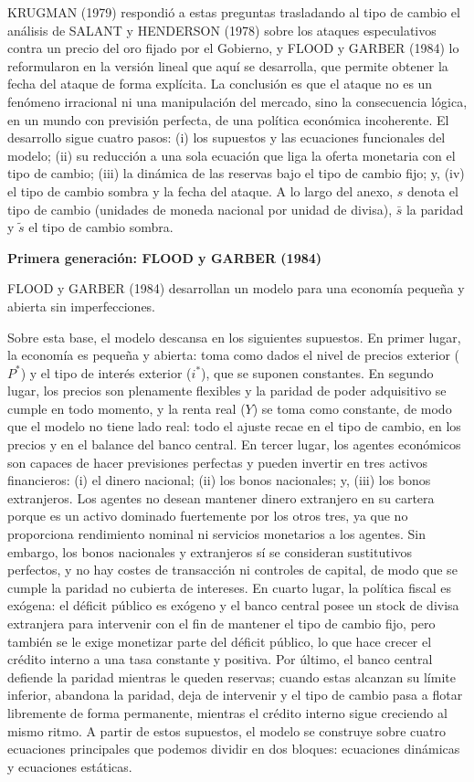 \documentclass[10pt,a4paper]{article}
\newcounter{anexo}
\begin{document}
KRUGMAN (1979) respondió a estas preguntas trasladando al tipo de cambio el análisis de SALANT y HENDERSON (1978) sobre los ataques especulativos contra un precio del oro fijado por el Gobierno, y FLOOD y GARBER (1984) lo reformularon en la versión lineal que aquí se desarrolla, que permite obtener la fecha del ataque de forma explícita. La conclusión es que el ataque no es un fenómeno irracional ni una manipulación del mercado, sino la consecuencia lógica, en un mundo con previsión perfecta, de una política económica incoherente. El desarrollo sigue cuatro pasos: (i) los supuestos y las ecuaciones funcionales del modelo; (ii) su reducción a una sola ecuación que liga la oferta monetaria con el tipo de cambio; (iii) la dinámica de las reservas bajo el tipo de cambio fijo; y, (iv) el tipo de cambio sombra y la fecha del ataque. A lo largo del anexo, $s$ denota el tipo de cambio (unidades de moneda nacional por unidad de divisa), $\bar s$ la paridad y $\tilde s$ el tipo de cambio sombra.


\textbf{Primera generación: FLOOD y GARBER (1984)}

FLOOD y GARBER (1984) desarrollan un modelo para una economía pequeña y abierta
sin imperfecciones.

Sobre esta base, el modelo descansa en los siguientes supuestos. En primer lugar, la economía es pequeña y abierta: toma como dados el nivel de precios exterior ($P^*$) y el tipo de interés exterior ($i^*$), que se suponen constantes. En segundo lugar, los precios son plenamente flexibles y la paridad de poder adquisitivo se cumple en todo momento, y la renta real ($Y$) se toma como constante, de modo que el modelo no tiene lado real: todo el ajuste recae en el tipo de cambio, en los precios y en el balance del banco central. En tercer lugar, los agentes económicos son capaces de hacer previsiones perfectas y pueden invertir en tres activos financieros: (i) el dinero nacional; (ii) los bonos nacionales; y, (iii) los bonos extranjeros. Los agentes no desean mantener dinero extranjero en su cartera porque es un activo dominado fuertemente por los otros tres, ya que no proporciona rendimiento nominal ni servicios monetarios a los agentes. Sin embargo, los bonos nacionales y extranjeros sí se consideran sustitutivos perfectos, y no hay costes de transacción ni controles de capital, de modo que se cumple la paridad no cubierta de intereses. En cuarto lugar, la política fiscal es exógena: el déficit público es exógeno y el banco central posee un stock de divisa extranjera para intervenir con el fin de mantener el tipo de cambio fijo, pero también se le exige monetizar parte del déficit público, lo que hace crecer el crédito interno a una tasa constante y positiva. Por último, el banco central defiende la paridad mientras le queden reservas; cuando estas alcanzan su límite inferior, abandona la paridad, deja de intervenir y el tipo de cambio pasa a flotar libremente de forma permanente, mientras el crédito interno sigue creciendo al mismo ritmo. A partir de estos supuestos, el modelo se construye sobre cuatro ecuaciones principales que podemos dividir en dos bloques: ecuaciones dinámicas y ecuaciones estáticas.
\end{document}
